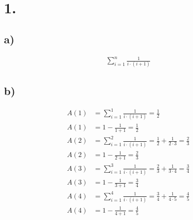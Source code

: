 \documentclass[a4paper]{scrartcl}
\title{\titleinfo}
\author{Arne Struck 6326505, René}
\date{\today}
\begin{document}
\maketitle
\notag
\section{1.}
	\subsection{a)}
		\begin{align}
			\sum^{n}_{i=1}\frac{1}{i\cdot(i+1)}
		\end{align}
		
	\subsection{b)}
		\begin{align}
			A(1)&=\sum^{1}_{i=1}\frac{1}{i\cdot(i+1)}=\frac{1}{2}\\
			A(1)&=1-\frac{1}{1+1}=\frac{1}{2}\\
			A(2)&=\sum^{2}_{i=1}\frac{1}{i\cdot(i+1)}=\frac{1}{2}+\frac{1}{2\cdot 3}=\frac{2}{3}\\
			A(2)&=1-\frac{1}{2+1}=\frac{2}{3}\\
			A(3)&=\sum^{3}_{i=1}\frac{1}{i\cdot(i+1)}=\frac{2}{3}+\frac{1}{3\cdot 4}=\frac{3}{4}\\
			A(3)&=1-\frac{1}{3+1}=\frac{3}{4}\\
			A(4)&=\sum^{4}_{i=1}\frac{1}{i\cdot(i+1)}=\frac{3}{4}+\frac{1}{4\cdot 5}=\frac{4}{5}\\
			A(4)&=1-\frac{1}{4+1}=\frac{4}{5}
		\end{align}
	
	\newpage
\end{document}
